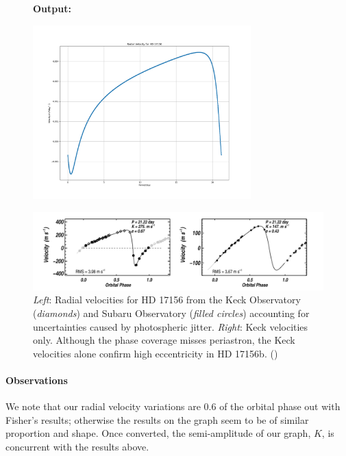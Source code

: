 \documentclass[11pt]{article}
\newcommand*{\figuretitle}[1]{
    	{\textbf{#1}
    	\par\vspace{-1em}}
    }
\begin{document}
\begin{figure}
	\figuretitle{Output:}
	\centering
	\includegraphics[width=0.75\textwidth]{../matplotlib_graphs/radial_velocity_1.png}
\end{figure} 
    

\begin{figure}
	\centering 
	\includegraphics[width=\textwidth]{../images/radial_v_graph.png}
	\caption{{\it Left}: Radial velocities for HD 17156 from the Keck Observatory ({\it diamonds}) and Subaru Observatory ({\it filled circles}) accounting for uncertainties caused by photospheric jitter. {\it Right}: Keck velocities only. Although the phase coverage misses periastron, the Keck velocities alone confirm high eccentricity in HD 17156b. (\cite{Fischer})} 
	\label{Figure 4.b}
\end{figure}



    \hypertarget{observations}{%
\paragraph{Observations}\label{observations_2}}

We note that our radial velocity variations are 0.6 of the orbital phase out with Fisher's results; otherwise the results on the graph seem to be of similar proportion and shape. Once converted, the semi-amplitude of our graph, \(K\), is concurrent with the results above.
\end{document}
